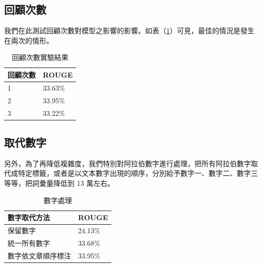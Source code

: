 \subsection{回顧次數}
我們在此測試回顧次數對模型之影響的影響。如表（\ref{table:hop}）可見，最佳的情況是發生在兩次的情形。%
\begin{table}
    \caption{回顧次數實驗結果}
    \label{table:hop}
    \centering
    \begin{tabular}{|l|l|}
        \hline
        回顧次數 & ROUGE\\
        \hline
        1 & 33.63\% \\
        \hline
        2 & 33.95\% \\%
        \hline
        3 & 33.22\% \\
        \hline
    \end{tabular}
\end{table}
\subsection{取代數字}
另外，為了再降低複雜度，我們特別對阿拉伯數字進行處理，把所有阿拉伯數字取代成特定標籤，或者是以文本數字出現的順序，分別給予數字一、數字二、數字三等等，把詞彙量降低到 13 萬左右。
\begin{table}
    \caption{數字處理}
    \label{table:digit}
    \centering
    \begin{tabular}{|l|l|}
        \hline
        數字取代方法 & ROUGE\\
        \hline
        保留數字 & 24.13\% \\%
        \hline
        統一所有數字 & 33.68\% \\
        \hline
        數字依文章順序標注 & 33.95\% \\
        \hline
    \end{tabular}
\end{table}
